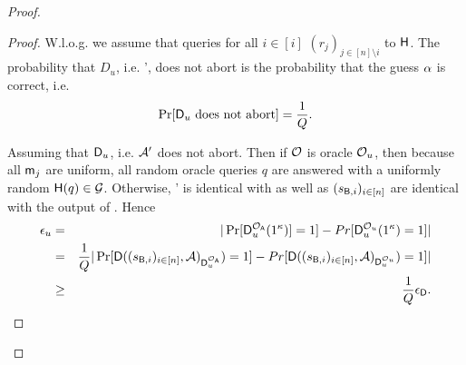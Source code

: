 \begin{proof}
\begin{proof}
W.l.o.g. we assume that \Adv queries for all $i\in[i]$ $(r_j)_{j\in[n]\setminus{i}}$ to $\mathsf{H}$. The probability that $D_u$, i.e. \Adv', does not abort is the probability that the guess $\alpha$ is correct, i.e.
$$
\Pr[\mathsf D_u\text{ does not abort}]=\frac{1}{Q}.
$$

Assuming that $\mathsf D_u$, i.e. $\mathcal{A}'$ does not abort. Then if $\mathcal{O}$ is oracle $\mathcal{O}_{u}$, then because all $\mathsf{m}_j$ are uniform, all random oracle queries $q$ are answered with a uniformly random $\mathsf{H}(q)\in\mathcal{G}$.  Otherwise, \Adv' is identical with \send as well as $(s_{\mathsf{B},i})_{i\in[n]}$ are identical with the output of \send.  
Hence 
\begin{eqnarray*}
\epsilon_{u}&=&|\Pr[\mathsf D_u^{\mathcal{O}_{\mathsf{A}}}(1^{\kappa})]=1]-Pr[\mathsf D_u^{\mathcal{O}_{u}}(1^{\kappa})=1]|\\
&= &\frac{1}{Q}|\Pr[\mathsf D((s_{\mathsf{B},i})_{i\in[n]},\mathcal{A})_{\mathsf D_u^{\mathcal{O}_{\mathsf{A}}}})=1]-Pr[\mathsf D((s_{\mathsf{B},i})_{i\in[n]},\mathcal{A})_{\mathsf D_u^{\mathcal{O}_{u}}})=1]|\\
&\geq&\frac{1}{Q}\epsilon_{\mathsf D}.
\end{eqnarray*}




\end{proof}
\end{proof}
